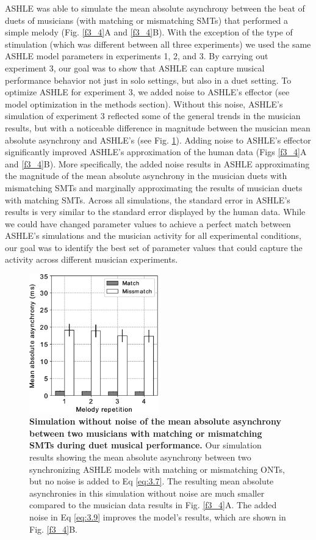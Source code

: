 \documentclass{report}
\begin{document}
ASHLE was able to simulate the mean absolute asynchrony between the beat of duets of musicians (with matching or mismatching SMTs) that performed a simple melody (Fig.{} \ref{f3_4}A and \ref{f3_4}B). With the exception of the type of stimulation (which was different between all three experiments) we used the same ASHLE model parameters in experiments 1, 2, and 3. By carrying out experiment 3, our goal was to show that ASHLE can capture musical performance behavior not just in solo settings, but also in a duet setting. To optimize ASHLE for experiment 3, we added noise to ASHLE's effector (see model optimization in the methods section). Without this noise, ASHLE's simulation of experiment 3 reflected some of the general trends in the musician results, but with a noticeable difference in magnitude between the musician mean absolute asynchrony and ASHLE's (see Fig.{} \ref{f3_5}). Adding noise to ASHLE's effector significantly improved ASHLE's approximation of the human data (Figs \ref{f3_4}A and \ref{f3_4}B). More specifically, the added noise results in ASHLE approximating the magnitude of the mean absolute asynchrony in the musician duets with mismatching SMTs and marginally approximating the results of musician duets with matching SMTs. Across all simulations, the standard error in ASHLE's results is very similar to the standard error displayed by the human data. While we could have changed parameter values to achieve a perfect match between ASHLE's simulations and the musician activity for all experimental conditions, our goal was to identify the best set of parameter values that could capture the activity across different musician experiments.

\begin{figure}
    \centering
    \includegraphics[width=0.5\textwidth]{figures/fig3_5.png}
    \caption[Simulation without noise of the mean absolute asynchrony between two musicians with matching or mismatching SMTs during duet musical performance]{\textbf{Simulation without noise of the mean absolute asynchrony between two musicians with matching or mismatching SMTs during duet musical performance.} Our simulation results showing the mean absolute asynchrony between two synchronizing ASHLE models with matching or mismatching ONTs, but no noise is added to Eq \eqref{eq:3.7}. The resulting mean absolute asynchronies in this simulation without noise are much smaller compared to the musician data results in Fig.{} \ref{f3_4}A. The added noise in Eq \eqref{eq:3.9} improves the model's results, which are shown in Fig.{} \ref{f3_4}B.}
    \label{f3_5}
\end{figure}
\end{document}
